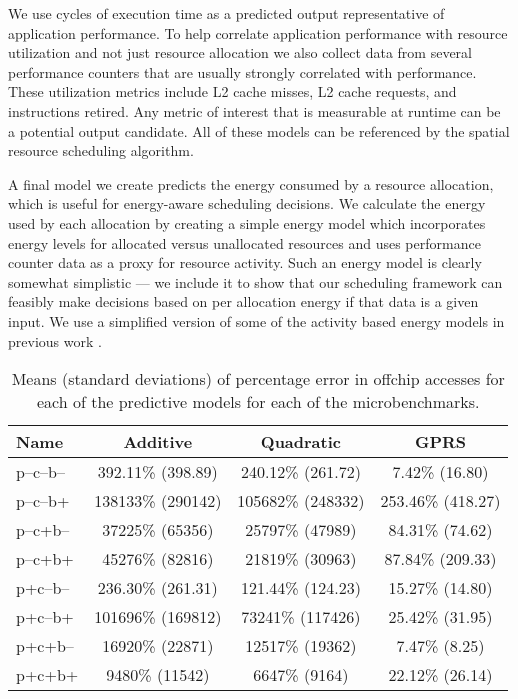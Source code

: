 
We use cycles of execution time as a predicted output representative of application performance.  To help correlate application performance with resource utilization and not just resource allocation we also collect data from several performance counters that are usually strongly correlated with performance. These utilization metrics include L2 cache misses, L2 cache requests, and instructions retired. Any metric of interest that is measurable at runtime can be a potential output candidate. All of these models can be referenced by the spatial resource scheduling algorithm.


A final model we create predicts the energy consumed by a resource allocation, which is useful  for energy-aware scheduling decisions. We calculate the energy used by each allocation by creating a simple energy model which incorporates energy levels for allocated versus unallocated resources and uses performance counter data as a proxy for resource activity.  Such an energy model is clearly somewhat simplistic --- we include it to show that our scheduling framework can feasibly make decisions based on per allocation energy if that data is a given input.  We use a simplified version of some of the activity based energy models in previous work \cite{}.

\begin{table}
\scriptsize
\begin{tabular}{|l|c|c|c|}
\hline
Name & Additive & Quadratic & GPRS \\ \hline
  p--c--b-- & 392.11\% (398.89) &  240.12\% (261.72) & 7.42\% (16.80)  \\ \hline
 p--c--b+ &  138133\% (290142)&  105682\% (248332) &  253.46\% (418.27)  \\ \hline
 p--c+b-- &   37225\% (65356) &  25797\% (47989) & 84.31\% (74.62)  \\ \hline
 p--c+b+ &   45276\% (82816) &  21819\% (30963) &  87.84\% (209.33)  \\ \hline
 p+c--b-- & 236.30\% (261.31) &  121.44\% (124.23) & 15.27\% (14.80)    \\ \hline
 p+c--b+ &   101696\% (169812)  &  73241\% (117426) & 25.42\% (31.95) \\ \hline
 p+c+b--&  16920\% (22871)&   12517\% (19362) & 7.47\% (8.25)  \\ \hline
 p+c+b+&   9480\% (11542) &  6647\% (9164) &  22.12\% (26.14)  \\ \hline
  \end{tabular}
 \caption{Means (standard deviations) of percentage error in offchip accesses for each of the predictive models for each of the microbenchmarks.}
\label{table:acc-offchip}
\end{table}

